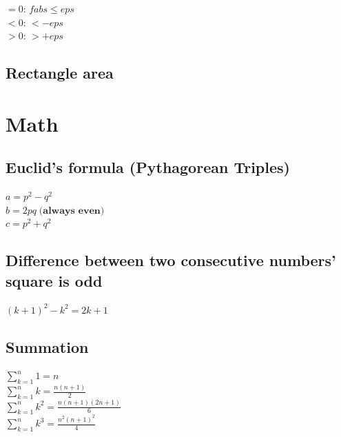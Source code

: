 \documentclass[10pt,oneside]{article}
\begin{document}
\begin{landscape}
\begin{multicols}{2}
{\normalsize 

$=0$: $fabs \leq eps$\\
$<0$: $ < -eps$\\
$>0$: $ > +eps$
}


\subsection{Rectangle area}

\section{Math}

\subsection{Euclid's formula (Pythagorean Triples)}

{\normalsize 
$a = p^2 - q^2 $\\
$b = 2pq \; \textbf{(always even)}$ \\
$c = p^2 + q^2$\\
}

\subsection{Difference between two consecutive numbers' square is odd}

{\normalsize 
$(k + 1)^2 - k^2 = 2k + 1$
}

\subsection{Summation}

{\normalsize 
$\sum_{k=1}^{n} 1= n$\\
$\sum_{k=1}^{n} k= \frac{n(n+1)}{2}$\\
$\sum_{k=1}^{n} k^2= \frac{n(n+1)(2n+1)}{6}$\\
$\sum_{k=1}^{n} k^3= \frac{n^2(n+1)^2}{4}$\\
}


\end{multicols}
\end{landscape}
\end{document}
